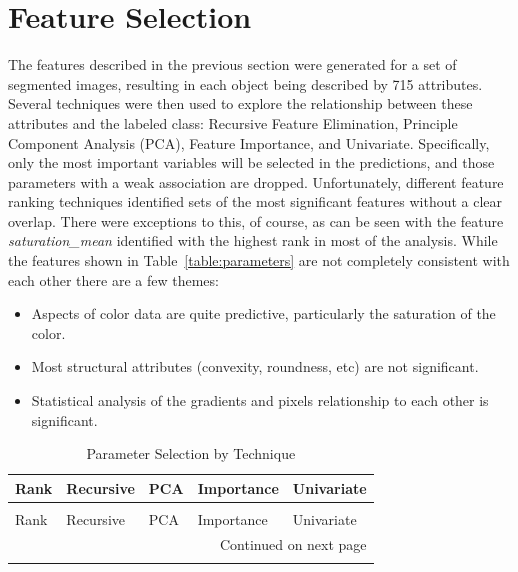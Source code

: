 \documentclass[letterpaper]{article}
\begin{document}
{\section{Feature Selection}
The features described in the previous section were generated for a set of segmented images, resulting in each object being described by 715 attributes. Several techniques were then used to explore the relationship between these attributes and the labeled class: Recursive Feature Elimination, Principle Component Analysis (PCA), Feature Importance, and Univariate.  Specifically, only the most important variables will be selected in the predictions, and those parameters with a weak association are dropped. Unfortunately, different feature ranking techniques identified sets of the most significant features without a clear overlap. There were exceptions to this, of course, as can be seen with the feature \textit{saturation\_mean} identified with the highest rank in most of the analysis.
While the features shown in Table~\ref{table:parameters} are not completely consistent with each other there are a few themes:
\begin{itemize}
\item{Aspects of color data are quite predictive, particularly the saturation of the color.}
\item{Most structural attributes (convexity, roundness, etc) are not significant.}
\item{Statistical analysis of the gradients and pixels relationship to each other is significant.}
\end{itemize}


\begin{longtable}{lllll}
\caption[Parameters Identified by Selection Technique]{Parameters Identified by Selection Technique}\\
\toprule
{}Rank &                  Recursive &                       PCA &              Importance &       Univariate \\
\midrule
\endfirsthead
\caption[Parameter Selection by Technique]{Parameter Selection by Technique} \\
\toprule
{}Rank &                  Recursive &                       PCA &              Importance &       Univariate \\
\midrule
\endhead
\midrule
\multicolumn{5}{r}{{Continued on next page}} \\
\midrule
\endfoot


\end{longtable}}
\end{document}

